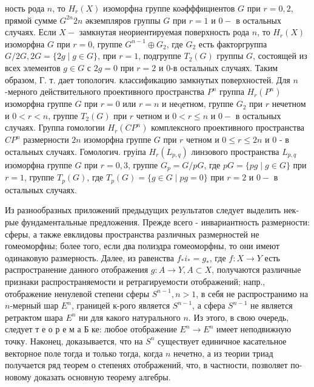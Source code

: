 \documentclass[10pt]{article}
\begin{document}
ность рода $n$, то $H_{r}(X)$ изоморфна группе коәфффициентов $G$ при $r=0,2$, прямой сумме $G^{2 n} 2 n$ әкземпляров группы $G$ при $r=1$ и $0-$ в остальных случаях. Если $X-$ замкнутая неориентируемая поверхность рода $n$, то $H_{r}(X)$ изоморфна $G$ при $r=0$, группе $G^{n-1} \oplus G_{2}$, где $G_{2}$ есть факторгруппа $G / 2 G, 2 G=\{2 g \mid g \in G\}$, при $r=1$, подгруппе $T_{2}(G)$ группы $G$, состоящей из всех элементов $g \in G$ с $2 g=0$ при $r=2$ и 0-в остальных случаях. Таким образом, Г. т. дает топологич. классификацию замкнутых поверхностей. Для $n$-мерного действительного проективного пространства $P^{n}$ группа $H_{r}\left(P^{n}\right)$ изоморфна группе $G$ при $r=0$ или $r=n$ и неqетном, группе $G_{2}$ при $r$ нечетном и $0<r<n$, группе $T_{2}(G)$ при $r$ четном и $0<r \leqslant n$ и $0-$ в остальных случаях. Группа гомологии $H_{r}\left(C P^{n}\right)$ комплексного проективного пространства $C P^{n}$ размерности $2 n$ изоморфна группе $G$ при $r$ четном и $0 \leqslant r \leqslant 2 n$ и 0 - в остальных случаях. Гомологич. груіпа $H_{r}\left(L_{p, q}\right)$ линзового пространства $L_{p, q}$ изоморфна группе $G$ при $r=0,3$, группе $G_{p}=G / p G$, где $p G=\{p g \mid g \in G\}$ при $r=1$, группе $T_{p}(G)$, где $T_{p}(G)=\{g \in G \mid p g=0\}$ при $r=2$ и $0-$ в остальных случаях.



Из разнообразных приложений предыдущих результатов следует выделить нек-рые фундаментальные предложения. Прежде всего - инвариантность размерности: сферы, а также евклидовы пространства различных размерностей не гомеоморфны; более того, если два полиэдра гомеоморфны, то они имеют одинаковую размерность. Далее, из равенства $f_{*} i_{*}=g_{*}$, где $f: X \rightarrow Y$ есть распространение данного отображения $g: A \rightarrow Y, A \subset X$, получаются различные признаки распространяемости и ретрагируемости отображений; напр., отображение ненулевой степени сферы $S^{n-1}, n>1$, в себя не распространимо на $n$-мерный шар $E^{n}$, границей к-рого является $S^{n-1}$, а сфера $S^{n-1}$ не является ретрактом шара $E^{n}$ ни для какого натурального $n$. Из этого, в свою очередь, следует т е о р е м а Б ке: любое отображение $E^{n} \rightarrow E^{n}$ имеет неподвижную точку. Наконец, доказывается, что на $S^{n}$ существует единичное касательное векторное поле тогда и только тогда, когда $n$ нечетно, а из теории триад получается ряд теорем о степенях отображений, что, в частности, позволяет по-новому доказать основную теорему алгебры.
\end{document}
